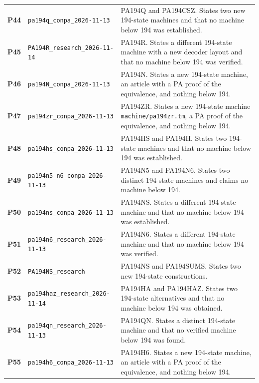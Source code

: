 \begin{longtable}{@{}>{\raggedright\arraybackslash}p{.055\linewidth}>{\raggedright\arraybackslash}p{.355\linewidth}>{\raggedright\arraybackslash}p{.55\linewidth}@{}}
\hypertarget{packet-P44}{\textbf{P44}} & \nolinkurl{pa194q_conpa_2026-11-13} & PA194Q and PA194CSZ. States two new 194-state machines and that no machine below 194 was established.\\[3pt]
\hypertarget{packet-P45}{\textbf{P45}} & \nolinkurl{PA194R_research_2026-11-14} & PA194R. States a different 194-state machine with a new decoder layout and that no machine below 194 was verified.\\[3pt]
\hypertarget{packet-P46}{\textbf{P46}} & \nolinkurl{pa194N_conpa_2026-11-13} & PA194N. States a new 194-state machine, an article with a PA proof of the equivalence, and nothing below 194.\\[3pt]
\hypertarget{packet-P47}{\textbf{P47}} & \nolinkurl{pa194zr_conpa_2026-11-13} & PA194ZR. States a new 194-state machine \nolinkurl{machine/pa194zr.tm}, a PA proof of the equivalence, and nothing below 194.\\[3pt]
\hypertarget{packet-P48}{\textbf{P48}} & \nolinkurl{pa194hs_conpa_2026-11-13} & PA194HS and PA194H. States two 194-state machines and that no machine below 194 was established.\\[3pt]
\hypertarget{packet-P49}{\textbf{P49}} & \nolinkurl{pa194n5_n6_conpa_2026-11-13} & PA194N5 and PA194N6. States two distinct 194-state machines and claims no machine below 194.\\[3pt]
\hypertarget{packet-P50}{\textbf{P50}} & \nolinkurl{pa194ns_conpa_2026-11-13} & PA194NS. States a different 194-state machine and that no machine below 194 was established.\\[3pt]
\hypertarget{packet-P51}{\textbf{P51}} & \nolinkurl{pa194n6_research_2026-11-13} & PA194N6. States a different 194-state machine and that no machine below 194 was verified.\\[3pt]
\hypertarget{packet-P52}{\textbf{P52}} & \nolinkurl{PA194NS_research} & PA194NS and PA194SUMS. States two new 194-state constructions.\\[3pt]
\hypertarget{packet-P53}{\textbf{P53}} & \nolinkurl{pa194haz_research_2026-11-14} & PA194HA and PA194HAZ. States two 194-state alternatives and that no machine below 194 was obtained.\\[3pt]
\hypertarget{packet-P54}{\textbf{P54}} & \nolinkurl{pa194qn_research_2026-11-13} & PA194QN. States a distinct 194-state machine and that no verified machine below 194 was found.\\[3pt]
\hypertarget{packet-P55}{\textbf{P55}} & \nolinkurl{pa194h6_conpa_2026-11-13} & PA194H6. States a new 194-state machine, an article with a PA proof of the equivalence, and nothing below 194.\\[3pt]

\end{longtable}
